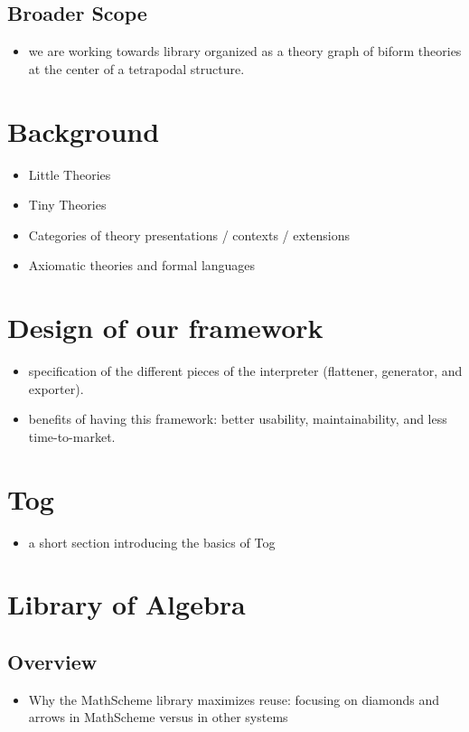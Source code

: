 \documentclass[]{article}
\begin{document}
\subsection{Broader Scope}
\begin{itemize}
    \item we are working towards library organized as a theory graph of biform theories at the center of a tetrapodal structure.  
\end{itemize}

\section{Background}
\begin{itemize}
    \item Little Theories 
    \item Tiny Theories 
    \item Categories of theory presentations / contexts / extensions 
    \item Axiomatic theories and formal languages 
\end{itemize}
    
\section{Design of our framework}
\begin{itemize}
    \item specification of the different pieces of the interpreter (flattener, generator, and exporter). 
    \item benefits of having this framework: better usability, maintainability, and less time-to-market. 
\end{itemize}    

\section{Tog}
\begin{itemize}
    \item a short section introducing the basics of Tog 
\end{itemize}

\section{Library of Algebra}
\subsection{Overview}
    \begin{itemize}
        \item Why the MathScheme library maximizes reuse: focusing on diamonds and arrows in MathScheme versus in other systems 
    \end{itemize}
\end{document}
